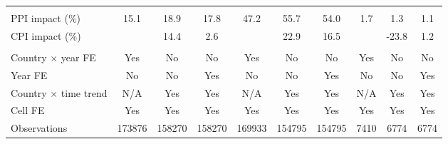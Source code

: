 {\begin{tabular}{l*{9}{c}}
\hline \\ PPI impact (\%)&        15.1         &        18.9         &        17.8         &        47.2         &        55.7         &        54.0         &         1.7         &         1.3         &         1.1         \\
CPI impact (\%)     &                     &        14.4         &         2.6         &                     &        22.9         &        16.5         &                     &       -23.8         &         1.2         \\
\hline \\ Country $\times$ year FE&         Yes         &          No         &          No         &         Yes         &          No         &          No         &         Yes         &          No         &          No         \\
Year FE             &          No         &          No         &         Yes         &          No         &          No         &         Yes         &          No         &          No         &         Yes         \\
Country $\times$ time trend&         N/A         &         Yes         &         Yes         &         N/A         &         Yes         &         Yes         &         N/A         &         Yes         &         Yes         \\
Cell FE             &         Yes         &         Yes         &         Yes         &         Yes         &         Yes         &         Yes         &         Yes         &         Yes         &         Yes         \\
Observations        &      173876         &      158270         &      158270         &      169933         &      154795         &      154795         &        7410         &        6774         &        6774         \\
\hline\hline
\end{tabular}
}
